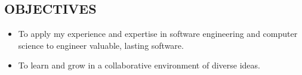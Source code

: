 \documentclass[line,margin]{res}
\begin{document}
\address{wilsoniya@gmail.com}
\address{(312) 404--0425}

\begin{resume}


\section{OBJECTIVES}
    \begin{itemize}
        \item To apply my experience and expertise in software engineering and
            computer science to engineer valuable, lasting software.
        \item To learn and grow in a collaborative environment of diverse
            ideas.
    \end{itemize}



\end{resume}
\end{document}
